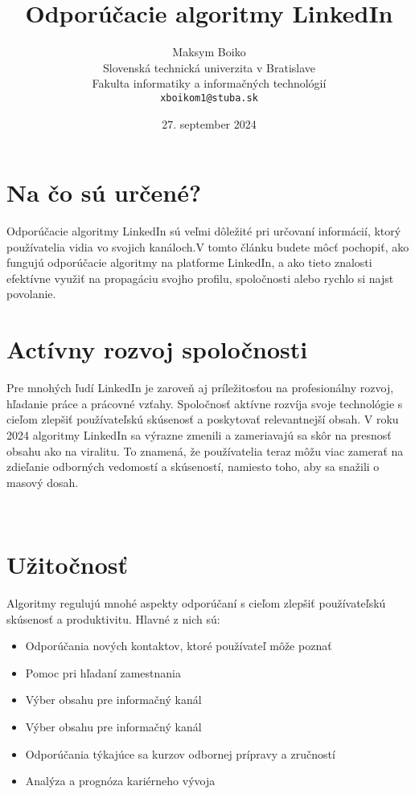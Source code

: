 \documentclass[twoside,slovak,a4paper]{coursepaper}
\title{Odporúčacie algoritmy LinkedIn\centering}
\author{Maksym Boiko\\[2pt]
{ Slovenská technická univerzita v Bratislave}\\
{ Fakulta informatiky a informačných technológií}\\
{ \texttt{xboikom1@stuba.sk}}
}
\date{\small 27. september 2024}
\begin{document}
\maketitle

\section{Na čo sú určené?}
Odporúčacie algoritmy LinkedIn sú veľmi dôležité pri určovaní informácií, ktorý používatelia vidia vo svojich kanáloch.V tomto článku budete môcť pochopiť, ako fungujú odporúčacie algoritmy na platforme LinkedIn, a ako tieto znalosti efektívne využiť na propagáciu svojho profilu, spoločnosti alebo rychlo si najst povolanie.

\section{Actívny rozvoj spoločnosti} \label{rozvoj spoločnosti}

Pre mnohých ľudí LinkedIn je zaroveň aj príležitosťou na profesionálny rozvoj, hľadanie práce a prácovné vzťahy.
Spoločnosť aktívne rozvíja svoje technológie s cieľom zlepšiť používateľskú skúsenosť a poskytovať relevantnejší obsah. V roku 2024 algoritmy LinkedIn sa výrazne zmenili a zameriavajú sa skôr na presnosť obsahu ako na viralitu. To znamená, že používatelia teraz môžu viac zamerať na zdieľanie odborných vedomostí a skúseností, namiesto toho, aby sa snažili o masový dosah.

~\cite{Oladipo:article}
~\cite{Terez:article}
\section{Užitočnosť} \label{Užitočnosť}
Algoritmy regulujú mnohé aspekty odporúčaní s cieľom zlepšiť používateľskú skúsenosť a produktivitu. Hlavné z nich sú:

\begin{itemize}
	\item Odporúčania nových kontaktov, ktoré používateľ môže poznať
	\item Pomoc pri hľadaní zamestnania
	\item Výber obsahu pre informačný kanál
	\item Výber obsahu pre informačný kanál
	\item Odporúčania týkajúce sa kurzov odbornej prípravy a zručností
	\item Analýza a prognóza kariérneho vývoja
  \end{itemize}
\end{document}
